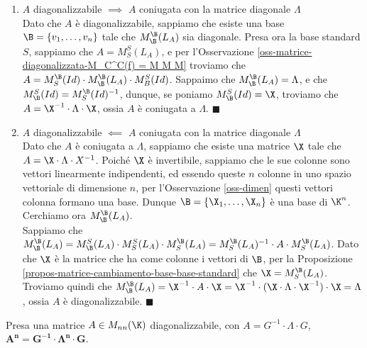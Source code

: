 \documentclass[11pt, a4paper, titlepage, oneside]{scrbook}
\begin{document}
\begin{enumerate}[label=\arabic*°]
    \item $A$ diagonalizzabile $\implies$ $A$ coniugata con la matrice diagonale $\Lambda$ \\
    Dato che $A$ è diagonalizzabile, sappiamo che esiste una base $\B = \{v_1, \ldots, v_n\}$ tale che $M_\B^\B(L_A)$ sia diagonale. Presa ora la base standard $S$, sappiamo che $A = M_S^S(L_A)$, e per l'Osservazione \ref{oss-matrice-diagonalizzata-M_C^C(f) = M M M} troviamo che $A = M_S^\B(Id) \cdot M_\B^\B(L_A) \cdot M_B^S(Id)$. Sappaimo che $M_\B^\B(L_A) = \Lambda$, e che $M_\B^S(Id) = M_S^\B(Id)^{-1}$, dunque, se poniamo $M_\B^S(Id) = \X$, troviamo che $A = \X^{-1} \cdot \Lambda \cdot \X$, ossia $A$ è coniugata a $\Lambda$. $\blacksquare$
    \item $A$ diagonalizzabile $\impliedby$ $A$ coniugata con la matrice diagonale $\Lambda$ \\
    Dato che $A$ è coniugata a $\Lambda$, sappiamo che esiste una matrice $\X$ tale che $A = \X \cdot \Lambda \cdot X^{-1}$. Poiché $\X$ è invertibile, sappiamo che le sue colonne sono vettori linearmente indipendenti, ed essendo queste $n$ colonne in uno spazio vettoriale di dimensione $n$, per l'Osservazione \ref{oss-dimen} questi vettori colonna formano una base. Dunque $\B = \{\X_1, \ldots, \X_n\}$ è una base di $\K^n$. Cerchiamo ora $M_\B^\B(L_A)$. \\
    Sappiamo che $M_\B^\B(L_A) = M_\B^S(L_A) \cdot M_S^S(L_A) \cdot M_S^\B(L_A) = M_S^\B(L_A)^{-1} \cdot A \cdot M_S^\B(L_A)$. Dato che $\X$ è la matrice che ha come colonne i vettori di $\B$, per la Proposizione \ref{propos-matrice-cambiamento-base-base-standard} che $\X = M_S^\B(L_A)$. Troviamo quindi che \mbox{$M_\B^\B(L_A) = \X^{-1} \cdot A \cdot \X = \X^{-1} \cdot (\X \cdot \Lambda \cdot \X^{-1}) \cdot \X = \Lambda$}, ossia $A$ è diagonalizzabile. $\blacksquare$
\end{enumerate}

\begin{Osservazione}[]
\label{oss-A diagonalizzabile con Lambda rende potenza facile}
Presa una matrice $A \in M_{nn}(\K)$ diagonalizzabile, con $A = G^{-1} \cdot \Lambda \cdot G$, $\bm{A^n = G^{-1} \cdot \Lambda^n \cdot G}$.
\end{Osservazione}

\Dimostrazione \nopagebreak
\end{document}
